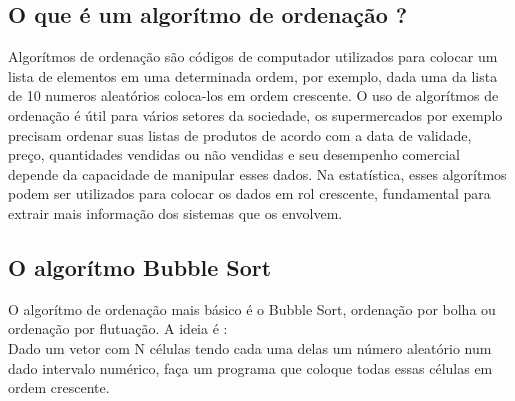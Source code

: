 \documentclass[11pts]{book}
\begin{document}
\subsection{O que é um algorítmo de ordenação ?}

Algorítmos de ordenação são códigos de computador utilizados para colocar um lista de elementos em uma determinada ordem, por exemplo, dada uma da lista de 10 numeros aleatórios coloca-los em ordem crescente. O uso de algorítmos de ordenação é útil para vários setores da sociedade, os supermercados por exemplo precisam ordenar suas listas de produtos de acordo com a data de validade, preço, quantidades vendidas ou não vendidas e seu desempenho comercial depende da capacidade de manipular esses dados. Na estatística, esses algorítmos podem ser utilizados para colocar os dados em rol crescente, fundamental para extrair mais informação dos sistemas que os envolvem. \\

\subsection{O algorítmo Bubble Sort}

O algorítmo de ordenação mais básico é o Bubble Sort,  ordenação por bolha ou ordenação por flutuação. A ideia é :\\
Dado um vetor com N células tendo cada uma delas um número aleatório num dado intervalo numérico, faça um programa que coloque todas essas células em ordem crescente.\\
\end{document}
